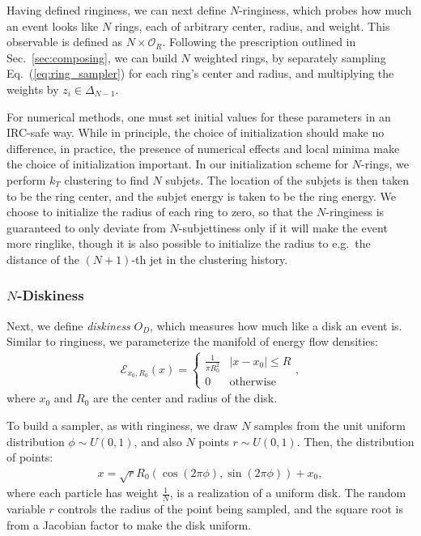 \documentclass[letterpaper,11pt]{article}
\newcommand{\E}{\mathcal{E}}
\DeclareRobustCommand{\Sec}[1]{Sec.~\ref{sec:#1}}
\DeclareRobustCommand{\Eq}[1]{Eq.~(\ref{eq:#1})}
\begin{document}
Having defined ringiness, we can next define $N$-ringiness, which probes how much an event looks like $N$ rings, each of arbitrary center, radius, and weight. This observable is defined as $N\times \mathcal{O}_R$. Following the prescription outlined in \Sec{composing}, we can build $N$ weighted rings, by separately sampling \Eq{ring_sampler} for each ring's center and radius, and multiplying the weights by $z_i \in \Delta_{N-1}$. 

For numerical methods, one must set initial values for these parameters in an IRC-safe way. While in principle, the choice of initialization should make no difference, in practice, the presence of numerical effects and local minima make the choice of initialization important. In our initialization scheme for $N$-rings, we perform $k_T$ clustering to find $N$ subjets. The location of the subjets is then taken to be the ring center, and the subjet energy is taken to be the ring energy. We choose to initialize the radius of each ring to zero, so that the $N$-ringiness is guaranteed to only deviate from $N$-subjettiness only if it will make the event more ringlike, though it is also possible to initialize the radius to e.g.\ the distance of the $(N+1)$-th jet in the clustering history. 


\subsubsection{$N$-Diskiness}\label{sec:n_diskiness}

Next, we define \emph{diskiness} $O_D$, which measures how much like a disk an event is. Similar to ringiness, we parameterize the manifold of energy flow densities:
%
\begin{align}
    \E_{x_0, R_0}(x) =\begin{cases} 
      \frac{1}{\pi R_0^2} & |x-x_0| \leq R \\
      0 & \text{otherwise}   
      \end{cases},
\end{align}
%
where $x_0$ and $R_0$ are the center and radius of the disk.
 
To build a sampler, as with ringiness, we draw $N$ samples from the unit uniform distribution $\phi \sim U(0,1)$, and also $N$ points $r \sim U(0,1)$. Then, the distribution of points:
%
\begin{align}
    x = \sqrt{r}R_0\left(\cos(2\pi\phi), \sin(2\pi\phi)\right) + x_0, \label{eq:disk_sampler}
\end{align}
%
where each particle has weight $\frac{1}{N}$, is a realization of a uniform disk. The random variable $r$ controls the radius of the point being sampled, and the square root is from a Jacobian factor to make the disk uniform. 
\end{document}
